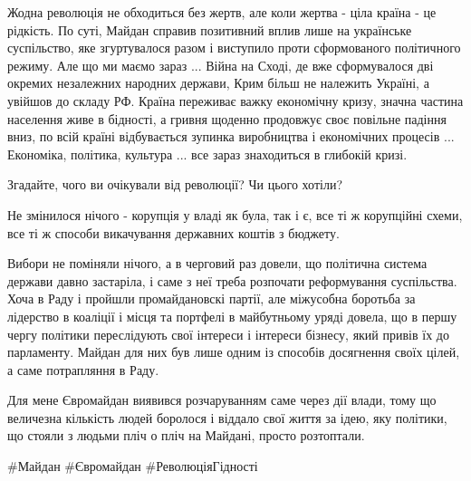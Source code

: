 Жодна революція не обходиться без жертв, але коли жертва - ціла країна - це
рідкість. По суті, Майдан справив позитивний вплив лише на українське
суспільство, яке згуртувалося разом і виступило проти сформованого політичного
режиму. Але що ми маємо зараз ... Війна на Сході, де вже сформувалося дві
окремих незалежних народних держави, Крим більш не належить Україні, а увійшов
до складу РФ. Країна переживає важку економічну кризу, значна частина населення
живе в бідності, а гривня щоденно продовжує своє повільне падіння вниз, по всій
країні відбувається зупинка виробництва і економічних процесів ... Економіка,
політика, культура ... все зараз знаходиться в глибокій кризі.

Згадайте, чого ви очікували від революції? Чи цього хотіли?

Не змінилося нічого - корупція у владі як була, так і є, все ті ж корупційні
схеми, все ті ж способи викачування державних коштів з бюджету.

Вибори не поміняли нічого, а в черговий раз довели, що політична система
держави давно застаріла, і саме з неї треба розпочати реформування суспільства.
Хоча в Раду і пройшли промайдановскі партії, але міжусобна боротьба за
лідерство в коаліції і місця та портфелі в майбутньому уряді довела, що в першу
чергу політики переслідують свої інтереси і інтереси бізнесу, який привів їх до
парламенту. Майдан для них був лише одним із способів досягнення своїх цілей, а
саме потрапляння в Раду.

Для мене Євромайдан виявився розчаруванням саме через дії влади, тому що
величезна кількість людей боролося і віддало свої життя за ідею, яку політики,
що стояли з людьми пліч о пліч на Майдані, просто розтоптали.

\#Майдан \#Євромайдан \#РеволюціяГідності

